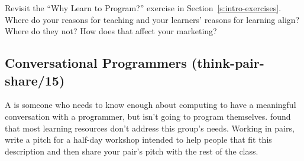 Revisit the ``Why Learn to Program?'' exercise in Section~\ref{s:intro-exercises}.
Where do your reasons for teaching and your learners' reasons for learning align?
Where do they not?
How does that affect your marketing?

\subsection*{Conversational Programmers (think-pair-share/15)}

A 
is someone who needs to know enough about computing
to have a meaningful conversation with a programmer,
but isn't going to program themselves.
\cite{Wang2018} found that most learning resources don't address this group's needs.
Working in pairs,
write a pitch for a half-day workshop intended to help people that fit this description
and then share your pair's pitch with the rest of the class.
